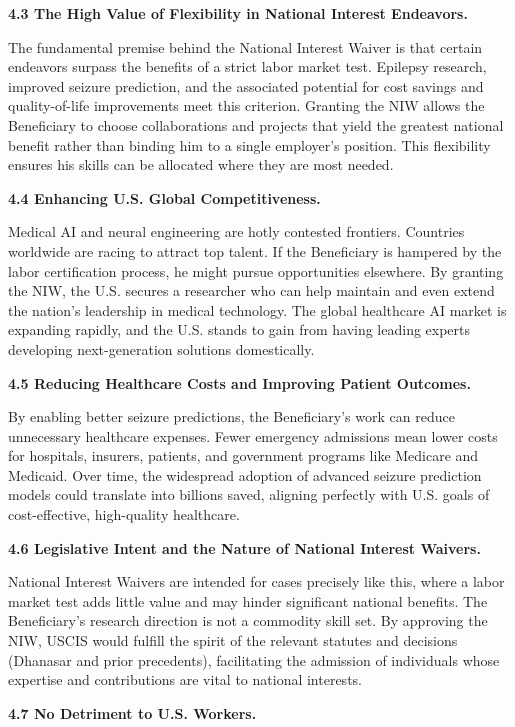 \documentclass{article}
\begin{document}
{\bf 4.3 The High Value of Flexibility in National Interest Endeavors.}

The fundamental premise behind the National Interest Waiver is that certain endeavors surpass the benefits of a strict labor market test. Epilepsy research, improved seizure prediction, and the associated potential for cost savings and quality-of-life improvements meet this criterion. Granting the NIW allows the Beneficiary to choose collaborations and projects that yield the greatest national benefit rather than binding him to a single employer’s position. This flexibility ensures his skills can be allocated where they are most needed.


{\bf 4.4 Enhancing U.S. Global Competitiveness.}

Medical AI and neural engineering are hotly contested frontiers. Countries worldwide are racing to attract top talent. If the Beneficiary is hampered by the labor certification process, he might pursue opportunities elsewhere. By granting the NIW, the U.S. secures a researcher who can help maintain and even extend the nation’s leadership in medical technology. The global healthcare AI market is expanding rapidly, and the U.S. stands to gain from having leading experts developing next-generation solutions domestically.


{\bf 4.5 Reducing Healthcare Costs and Improving Patient Outcomes.}

By enabling better seizure predictions, the Beneficiary’s work can reduce unnecessary healthcare expenses. Fewer emergency admissions mean lower costs for hospitals, insurers, patients, and government programs like Medicare and Medicaid. Over time, the widespread adoption of advanced seizure prediction models could translate into billions saved, aligning perfectly with U.S. goals of cost-effective, high-quality healthcare.


{\bf 4.6 Legislative Intent and the Nature of National Interest Waivers.}

National Interest Waivers are intended for cases precisely like this, where a labor market test adds little value and may hinder significant national benefits. The Beneficiary’s research direction is not a commodity skill set. By approving the NIW, USCIS would fulfill the spirit of the relevant statutes and decisions (Dhanasar and prior precedents), facilitating the admission of individuals whose expertise and contributions are vital to national interests.

{\bf 4.7 No Detriment to U.S. Workers.}
\end{document}
